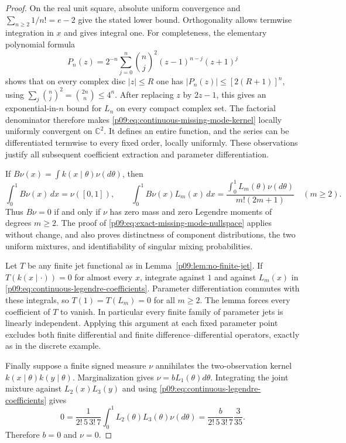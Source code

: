 \documentclass[11pt,letterpaper]{article}
\theoremstyle{definition}
\theoremstyle{remark}
\newcommand{\1}{\mathbf 1}
\begin{document}
\begin{proof}
On the real unit square, absolute uniform convergence and
$\sum_{n\ge2}1/n!=e-2$ give the stated lower bound.  Orthogonality
allows termwise integration in $x$ and gives integral one.
For completeness, the elementary polynomial formula
\[
 P_n(z)=2^{-n}\sum_{j=0}^n\binom nj^2
             (z-1)^{n-j}(z+1)^j
\]
shows that on every complex disc $|z|\le R$ one has
$|P_n(z)|\le[2(R+1)]^n$, using
$\sum_j\binom nj^2=\binom{2n}{n}\le4^n$.
After replacing $z$ by $2z-1$, this gives an exponential-in-$n$
bound for $L_n$ on every compact complex set.  The factorial denominator
therefore makes \eqref{p09:eq:continuous-missing-mode-kernel} locally
uniformly convergent on $\mathbb C^2$.  It defines an entire function,
and the series can be differentiated termwise to every fixed order,
locally uniformly.  These observations justify all subsequent
coefficient extraction and parameter differentiation.

If $B\nu(x)=\int k(x\mid\theta)\nu(d\theta)$, then
\begin{equation}
 \int_0^1 B\nu(x)\,dx=\nu([0,1]),\qquad
 \int_0^1 B\nu(x)L_m(x)\,dx
   =\frac{\int_0^1L_m(\theta)\nu(d\theta)}{m!(2m+1)}
 \quad(m\ge2).
 \label{p09:eq:continuous-legendre-coefficients}
\end{equation}
Thus $B\nu=0$ if and only if $\nu$ has zero mass and zero Legendre
moments of degrees $m\ge2$.  The proof of
\eqref{p09:eq:exact-missing-mode-nullspace} applies without change, and
also proves distinctness of component distributions, the two uniform
mixtures, and identifiability of singular mixing probabilities.

Let $T$ be any finite jet functional as in
Lemma~\ref{p09:lem:no-finite-jet}.  If $T(k(x\mid\cdot))=0$ for almost
every $x$, integrate against $1$ and against $L_m(x)$ in
\eqref{p09:eq:continuous-legendre-coefficients}.  Parameter differentiation
commutes with these integrals, so $T(1)=T(L_m)=0$ for all $m\ge2$.
The lemma forces every coefficient of $T$ to vanish.  In particular
every finite family of parameter jets is linearly independent.
Applying this argument at each fixed parameter point excludes both
finite differential and finite difference--differential operators,
exactly as in the discrete example.

Finally suppose a finite signed measure $\nu$ annihilates the
two-observation kernel $k(x\mid\theta)k(y\mid\theta)$.
Marginalization gives $\nu=bL_1(\theta)d\theta$.
Integrating the joint mixture against $L_2(x)L_3(y)$ and using
\eqref{p09:eq:continuous-legendre-coefficients} gives
\[
 0=\frac{1}{2!\,5\,3!\,7}
          \int_0^1L_2(\theta)L_3(\theta)\nu(d\theta)
   =\frac{b}{2!\,5\,3!\,7}\frac{3}{35}.
\]
Therefore $b=0$ and $\nu=0$.
\end{proof}
\end{document}
